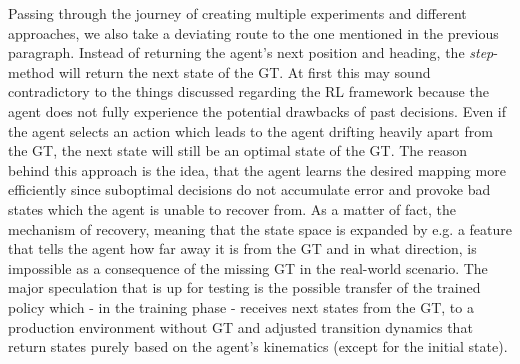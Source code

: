 Passing through the journey of creating multiple experiments and different approaches, we also take a deviating route to the one mentioned in the previous paragraph. Instead of returning the agent's next position and heading, the \textit{step}-method will return the next state of the GT. At first this may sound contradictory to the things discussed regarding the RL framework because the agent does not fully experience the potential drawbacks of past decisions. Even if the agent selects an action which leads to the agent drifting heavily apart from the GT, the next state will still be an optimal state of the GT. The reason behind this approach is the idea, that the agent learns the desired mapping more efficiently since suboptimal decisions do not accumulate error and provoke bad states which the agent is unable to recover from. As a matter of fact, the mechanism of recovery, meaning that the state space is expanded by e.g. a feature that tells the agent how far away it is from the GT and in what direction, is impossible as a consequence of the missing GT in the real-world scenario. The major speculation that is up for testing is the possible transfer of the trained policy which - in the training phase - receives next states from the GT, to a production environment without GT and adjusted transition dynamics that return states purely based on the agent's kinematics (except for the initial state).